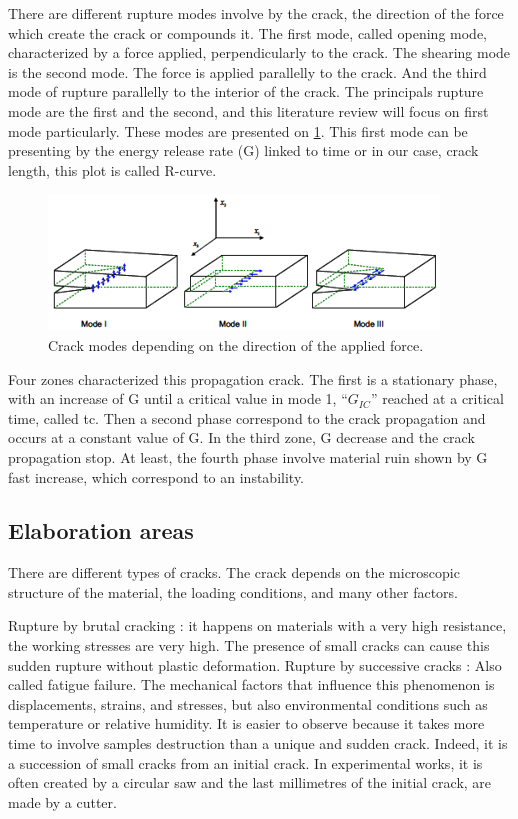 There are different rupture modes involve by the crack, the direction of the force which create the crack or compounds it. The first mode, called opening mode, characterized by a force applied, perpendicularly to the crack. The shearing mode is the second mode. The force is applied parallelly to the crack. And the third mode of rupture parallelly to the interior of the crack. The principals rupture mode are the first and the second, and this literature review will focus on first mode particularly. These modes are presented on \ref{fig:Fig3}. This first mode can be presenting by the energy release rate (G) linked to time or in our case, crack length, this plot is called R-curve.
\begin{figure}[th]
	\centering
	\includegraphics{Figures/Mode_presentation}
	\decoRule
	\caption[Crack modes]{Crack modes depending on the direction of the applied force.}
	\label{fig:Fig3}
\end{figure}
Four zones characterized this propagation crack. The first is a stationary phase, with an increase of G until a critical value in mode 1, “$G_{IC}$” reached at a critical time, called tc. Then a second phase correspond to the crack propagation and occurs at a constant value of G. In the third zone, G decrease and the crack propagation stop. At least, the fourth phase involve material ruin shown by G fast increase, which correspond to an instability.

\subsection{Elaboration areas}

There are different types of cracks. The crack depends on the microscopic structure of the material, the loading conditions, and many other factors.

Rupture by brutal cracking : it happens on materials with a very high resistance, the working stresses are very high. The presence of small cracks can cause this sudden rupture without plastic deformation. 
Rupture by successive cracks : Also called fatigue failure. The mechanical factors that influence this phenomenon is displacements, strains, and stresses, but also environmental conditions such as temperature or relative humidity. It is easier to observe because it takes more time to involve samples destruction than a unique and sudden crack. Indeed, it is a succession of small cracks from an initial crack. In experimental works, it is often created by a circular saw and the last millimetres of the initial crack, are made by a cutter.  

